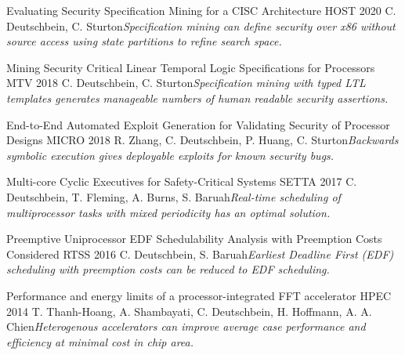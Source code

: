 
\begin{cventries}
  \cventry
    {}%
    {Evaluating Security Specification Mining for a CISC Architecture} %
    {HOST 2020} %
    {}
    {C. Deutschbein, C. Sturton\newline\textit{Specification mining can define security over x86 without source access using state partitions to refine search space.}}

  \cventry
    {}%
    {Mining Security Critical Linear Temporal Logic Specifications for Processors} %
    {MTV 2018} %
    {}
    {C. Deutschbein, C. Sturton\newline\textit{Specification mining with typed LTL templates generates manageable numbers of human readable security assertions.}}

  \cventry
    {}
    {End-to-End Automated Exploit Generation for Validating Security of Processor Designs} %
    {MICRO 2018} %
    {}
    {R. Zhang, C. Deutschbein, P. Huang, C. Sturton\newline\textit{Backwards symbolic execution gives deployable exploits for known security bugs.}\newline\color{red}{Nominated for Best Paper.}}

  \cventry
    {}
    {Multi-core Cyclic Executives for Safety-Critical Systems} %
    {SETTA 2017} %
    {}
    {C. Deutschbein, T. Fleming, A. Burns, S. Baruah\newline\textit{Real-time scheduling of multiprocessor tasks with mixed periodicity has an optimal solution.}}

  \cventry
    {}
    {Preemptive Uniprocessor EDF Schedulability Analysis with Preemption Costs Considered} %
    {RTSS 2016} %
    {}
    {C. Deutschbein, S. Baruah\newline\textit{Earliest Deadline First (EDF) scheduling with preemption costs can be reduced to EDF scheduling.}}

  \cventry
    {}
    {Performance and energy limits of a processor-integrated FFT accelerator} %
    {HPEC 2014} %
    {}
    {T. Thanh-Hoang, A. Shambayati, C. Deutschbein, H. Hoffmann, A. A. Chien\newline\textit{Heterogenous accelerators can improve average case performance and efficiency at minimal cost in chip area.}}

\end{cventries}
